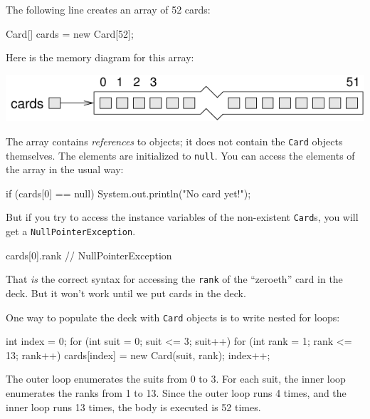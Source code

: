 \documentclass[12pt]{book}
\theoremstyle{exercise}
\newcommand{\java}[1]{\verb"#1"}
\newcommand{\java}[1]{\lstinline{#1}} %
\begin{document}
The following line creates an array of 52 cards:

\begin{code}
    Card[] cards = new Card[52];
\end{code}


Here is the memory diagram for this array:

\begin{center}
\includegraphics{figs/cardarray.pdf}
\end{center}


The array contains {\em references} to objects; it does not contain the \java{Card} objects themselves.
The elements are initialized to \java{null}.
You can access the elements of the array in the usual way:

\begin{code}
    if (cards[0] == null) {
        System.out.println("No card yet!");
    }
\end{code}


But if you try to access the instance variables of the non-existent \java{Card}s, you will get a \java{NullPointerException}.

\begin{code}
    cards[0].rank      // NullPointerException
\end{code}


That {\em is} the correct syntax for accessing the \java{rank} of the ``zeroeth'' card in the deck.
But it won't work until we put cards in the deck.


One way to populate the deck with \java{Card} objects is to write nested for loops:

\begin{code}
    int index = 0;
    for (int suit = 0; suit <= 3; suit++) {
        for (int rank = 1; rank <= 13; rank++) {
            cards[index] = new Card(suit, rank);
            index++;
        }
    }
\end{code}

The outer loop enumerates the suits from 0 to 3.
For each suit, the inner loop enumerates the ranks from 1 to 13.
Since the outer loop runs 4 times, and the inner loop runs 13 times, the body is executed is 52 times.
\end{document}
